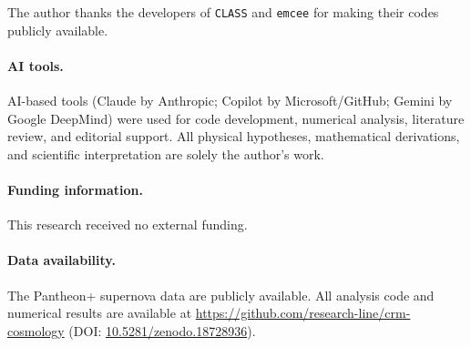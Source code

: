 \documentclass[aps,prd,twocolumn,superscriptaddress,nofootinbib]{revtex4-2}
\begin{document}
\begin{acknowledgments}
The author thanks the developers of \texttt{CLASS} \cite{Blas2011} and
\texttt{emcee} \cite{ForemanMackey2013} for making their codes publicly
available.

\paragraph{AI tools.}
AI-based tools (Claude by Anthropic; Copilot by Microsoft/GitHub; Gemini by Google DeepMind) were used
for code development, numerical analysis, literature review, and editorial
support. All physical hypotheses, mathematical derivations, and scientific
interpretation are solely the author's work.
\end{acknowledgments}

\paragraph{Funding information.}
This research received no external funding.

\paragraph{Data availability.}
The Pantheon+ supernova data \cite{Scolnic2022} are publicly available.
All analysis code and numerical results are available at
\url{https://github.com/research-line/crm-cosmology}
(DOI: \href{https://doi.org/10.5281/zenodo.18728936}{10.5281/zenodo.18728936}).
\end{document}
